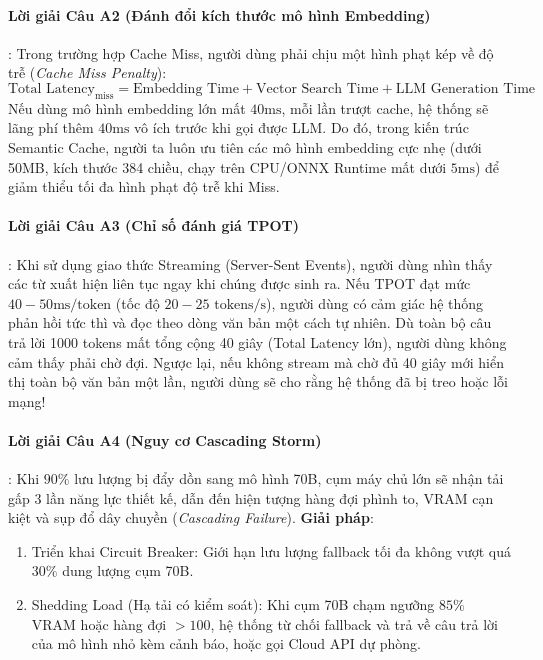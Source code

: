 \paragraph{Lời giải Câu A2 (Đánh đổi kích thước mô hình Embedding)}:
Trong trường hợp Cache Miss, người dùng phải chịu một hình phạt kép về độ trễ (\textit{Cache Miss Penalty}):
\begin{equation*}
\text{Total Latency}_{\text{miss}} = \text{Embedding Time} + \text{Vector Search Time} + \text{LLM Generation Time}
\end{equation*}
Nếu dùng mô hình embedding lớn mất $40\text{ms}$, mỗi lần trượt cache, hệ thống sẽ lãng phí thêm $40\text{ms}$ vô ích trước khi gọi được LLM.
Do đó, trong kiến trúc Semantic Cache, người ta luôn ưu tiên các mô hình embedding cực nhẹ (dưới 50MB, kích thước 384 chiều, chạy trên CPU/ONNX Runtime mất dưới $5\text{ms}$) để giảm thiểu tối đa hình phạt độ trễ khi Miss.

\paragraph{Lời giải Câu A3 (Chỉ số đánh giá TPOT)}:
Khi sử dụng giao thức Streaming (Server-Sent Events), người dùng nhìn thấy các từ xuất hiện liên tục ngay khi chúng được sinh ra.
Nếu TPOT đạt mức $40 - 50\text{ms/token}$ (tốc độ $20 - 25\text{ tokens/s}$), người dùng có cảm giác hệ thống phản hồi tức thì và đọc theo dòng văn bản một cách tự nhiên.
Dù toàn bộ câu trả lời 1000 tokens mất tổng cộng 40 giây (Total Latency lớn), người dùng không cảm thấy phải chờ đợi. Ngược lại, nếu không stream mà chờ đủ 40 giây mới hiển thị toàn bộ văn bản một lần, người dùng sẽ cho rằng hệ thống đã bị treo hoặc lỗi mạng!

\paragraph{Lời giải Câu A4 (Nguy cơ Cascading Storm)}:
Khi $90\%$ lưu lượng bị đẩy dồn sang mô hình 70B, cụm máy chủ lớn sẽ nhận tải gấp 3 lần năng lực thiết kế, dẫn đến hiện tượng hàng đợi phình to, VRAM cạn kiệt và sụp đổ dây chuyền (\textit{Cascading Failure}).
\textbf{Giải pháp}:
\begin{enumerate}
  \item Triển khai Circuit Breaker: Giới hạn lưu lượng fallback tối đa không vượt quá $30\%$ dung lượng cụm 70B.
  \item Shedding Load (Hạ tải có kiểm soát): Khi cụm 70B chạm ngưỡng $85\%$ VRAM hoặc hàng đợi $> 100$, hệ thống từ chối fallback và trả về câu trả lời của mô hình nhỏ kèm cảnh báo, hoặc gọi Cloud API dự phòng.
\end{enumerate}

